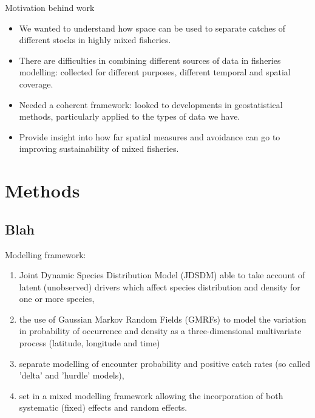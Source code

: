 \documentclass[xcolor=x11names,compress]{beamer}
\renewcommand{\(}{\begin{columns}}
\renewcommand{\)}{\end{columns}}
\newcommand{\<}[1]{\begin{column}{#1}}
\renewcommand{\>}{\end{column}}
\begin{document}
\begin{frame}{Motivation behind work}
	
\begin{itemize}
\small	
\setlength\itemsep{1em}

	\item We wanted to understand how space can be used to separate catches
		of different stocks in highly mixed fisheries. \pause
	\item There are difficulties in combining different sources of data in
		fisheries modelling: collected for different purposes,
		different temporal and spatial coverage. \pause
	\item Needed a coherent framework: looked to developments in
		geostatistical methods, particularly applied to the types of
		data we have. \pause
	\item Provide insight into how far spatial measures and avoidance can
		go to improving sustainability of mixed fisheries.
\end{itemize}

\end{frame}


\section{Methods}
\subsection{Blah}

\begin{frame}

Modelling framework:
\pause

\begin{enumerate}
	\small
	\setlength\itemsep{2em}

	\item Joint Dynamic Species Distribution Model (JDSDM) able to take
		account of latent (unobserved) drivers which affect species
		distribution and density for one or more species, \pause
	\item the use of Gaussian Markov Random Fields (GMRFs) to model the
		variation in probability of occurrence and density as a
		three-dimensional multivariate process (latitude, longitude and
		time) \pause
	\item separate modelling of encounter probability and positive catch
		rates (so called 'delta' and 'hurdle' models),  \pause
	\item set in a mixed modelling framework allowing the incorporation of
		both systematic (fixed) effects and random effects. 

\end{enumerate}

\end{frame}
\end{document}
